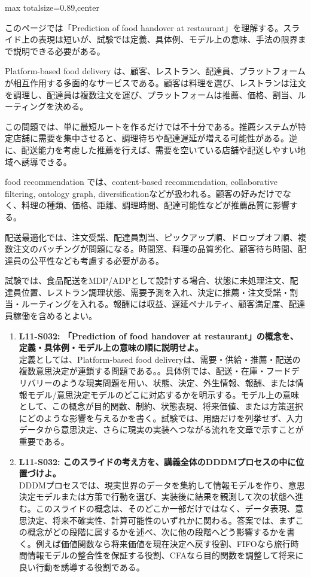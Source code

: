 \begin{minipage}[t]{0.58\textwidth}
\begin{adjustbox}{max totalsize={\textwidth}{0.89\textheight},center}
\begin{minipage}{\textwidth}\scriptsize
{}このページでは「Prediction of food handover at restaurant」を理解する。スライド上の表現は短いが、試験では定義、具体例、モデル上の意味、手法の限界まで説明できる必要がある。\par
Platform-based food delivery は、顧客、レストラン、配達員、プラットフォームが相互作用する多面的なサービスである。顧客は料理を選び、レストランは注文を調理し、配達員は複数注文を運び、プラットフォームは推薦、価格、割当、ルーティングを決める。\par
この問題では、単に最短ルートを作るだけでは不十分である。推薦システムが特定店舗に需要を集中させると、調理待ちや配達遅延が増える可能性がある。逆に、配送能力を考慮した推薦を行えば、需要を空いている店舗や配送しやすい地域へ誘導できる。\par
food recommendation では、content-based recommendation, collaborative filtering, ontology graph, diversificationなどが扱われる。顧客の好みだけでなく、料理の種類、価格、距離、調理時間、配達可能性などが推薦品質に影響する。\par
配送最適化では、注文受諾、配達員割当、ピックアップ順、ドロップオフ順、複数注文のバッチングが問題になる。時間窓、料理の品質劣化、顧客待ち時間、配達員の公平性なども考慮する必要がある。\par
試験では、食品配送をMDP/ADPとして設計する場合、状態に未処理注文、配達員位置、レストラン調理状態、需要予測を入れ、決定に推薦・注文受諾・割当・ルーティングを入れる。報酬には収益、遅延ペナルティ、顧客満足度、配達員稼働を含めるとよい。\par{}\begin{enumerate}\item \textbf{L11-S032: 「Prediction of food handover at restaurant」の概念を、定義・具体例・モデル上の意味の順に説明せよ。}\\定義としては、Platform-based food deliveryは、需要・供給・推薦・配送の複数意思決定が連鎖する問題である。。具体例では、配送・在庫・フードデリバリーのような現実問題を用い、状態、決定、外生情報、報酬、または情報モデル/意思決定モデルのどこに対応するかを明示する。モデル上の意味として、この概念が目的関数、制約、状態表現、将来価値、または方策選択にどのような影響を与えるかを書く。試験では、用語だけを列挙せず、入力データから意思決定、さらに現実の実装へつながる流れを文章で示すことが重要である。\item \textbf{L11-S032: このスライドの考え方を、講義全体のDDDMプロセスの中に位置づけよ。}\\DDDMプロセスでは、現実世界のデータを集約して情報モデルを作り、意思決定モデルまたは方策で行動を選び、実装後に結果を観測して次の状態へ進む。このスライドの概念は、そのどこか一部だけではなく、データ表現、意思決定、将来不確実性、計算可能性のいずれかに関わる。答案では、まずこの概念がどの段階に属するかを述べ、次に他の段階へどう影響するかを書く。例えば価値関数なら将来価値を現在決定へ戻す役割、FIFOなら旅行時間情報モデルの整合性を保証する役割、CFAなら目的関数を調整して将来に良い行動を誘導する役割である。\end{enumerate}

\end{minipage}
\end{adjustbox}
\end{minipage}
